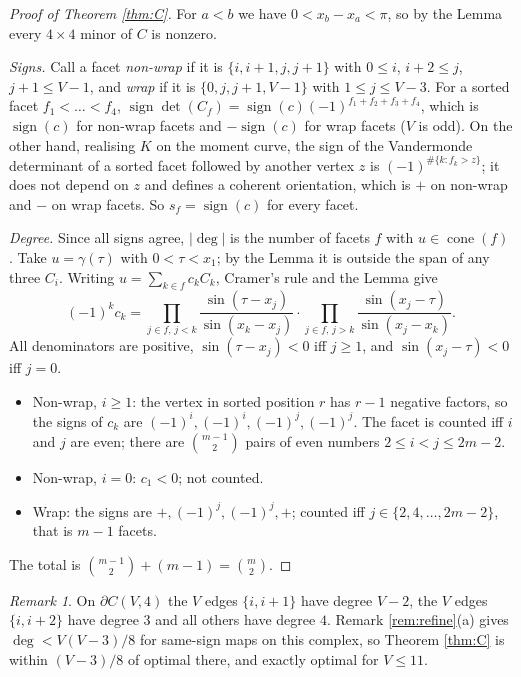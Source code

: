 \documentclass[11pt]{article}
\theoremstyle{remark}
\newtheorem{remark}[theorem]{Remark}
\newcommand{\cone}{\operatorname{cone}}
\newcommand{\sgn}{\operatorname{sign}}
\begin{document}
\begin{proof}[Proof of Theorem \ref{thm:C}]
For $a<b$ we have $0<x_b-x_a<\pi$, so by the Lemma every $4\times4$ minor of $C$ is nonzero.

\emph{Signs.} Call a facet \emph{non-wrap} if it is $\{i,i+1,j,j+1\}$ with $0\le i$, $i+2\le j$, $j+1\le V-1$, and \emph{wrap} if it is $\{0,j,j+1,V-1\}$ with $1\le j\le V-3$. For a sorted facet $f_1<\dots<f_4$, $\sgn\det(C_f)=\sgn(c)(-1)^{f_1+f_2+f_3+f_4}$, which is $\sgn(c)$ for non-wrap facets and $-\sgn(c)$ for wrap facets ($V$ is odd). On the other hand, realising $K$ on the moment curve, the sign of the Vandermonde determinant of a sorted facet followed by another vertex $z$ is $(-1)^{\#\{k:f_k>z\}}$; it does not depend on $z$ and defines a coherent orientation, which is $+$ on non-wrap and $-$ on wrap facets. So $s_f=\sgn(c)$ for every facet.

\emph{Degree.} Since all signs agree, $|\deg|$ is the number of facets $f$ with $u\in\cone(f)$. Take $u=\gamma(\tau)$ with $0<\tau<x_1$; by the Lemma it is outside the span of any three $C_i$. Writing $u=\sum_{k\in f}c_kC_k$, Cramer's rule and the Lemma give
\[
(-1)^kc_k=\prod_{j\in f,\,j<k}\frac{\sin(\tau-x_j)}{\sin(x_k-x_j)}\cdot\prod_{j\in f,\,j>k}\frac{\sin(x_j-\tau)}{\sin(x_j-x_k)} .
\]
All denominators are positive, $\sin(\tau-x_j)<0$ iff $j\ge1$, and $\sin(x_j-\tau)<0$ iff $j=0$.
\begin{itemize}
\item Non-wrap, $i\ge1$: the vertex in sorted position $r$ has $r-1$ negative factors, so the signs of $c_k$ are $(-1)^i,(-1)^i,(-1)^j,(-1)^j$. The facet is counted iff $i$ and $j$ are even; there are $\binom{m-1}{2}$ pairs of even numbers $2\le i<j\le2m-2$.
\item Non-wrap, $i=0$: $c_1<0$; not counted.
\item Wrap: the signs are $+,(-1)^j,(-1)^j,+$; counted iff $j\in\{2,4,\dots,2m-2\}$, that is $m-1$ facets.
\end{itemize}
The total is $\binom{m-1}{2}+(m-1)=\binom m2$.
\end{proof}

\begin{remark}
On $\partial C(V,4)$ the $V$ edges $\{i,i+1\}$ have degree $V-2$, the $V$ edges $\{i,i+2\}$ have degree $3$ and all others have degree $4$. Remark \ref{rem:refine}(a) gives $\deg<V(V-3)/8$ for same-sign maps on this complex, so Theorem \ref{thm:C} is within $(V-3)/8$ of optimal there, and exactly optimal for $V\le11$.
\end{remark}
\end{document}
